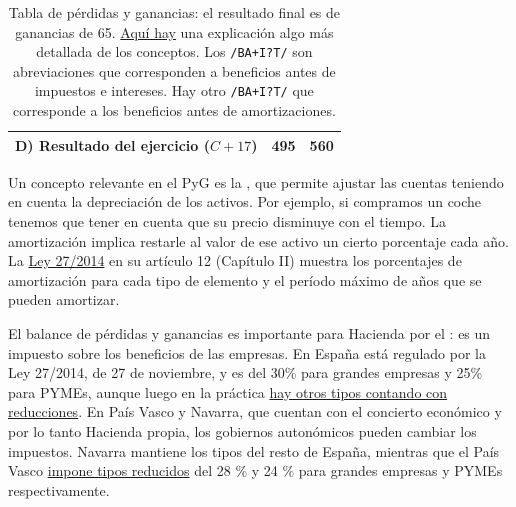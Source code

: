 \documentclass[nochap,palatino,notitlepage]{apuntes}
\begin{document}
\begin{table}[hbtp]
\begin{minipage}{\textwidth}
\begin{tabular}{l|c|c}
\textbf{D) Resultado del ejercicio} ($C + 17$) & \textbf{495} & \textbf{560} \\ \bottomrule
\end{tabular}
\caption{Tabla de pérdidas y ganancias: el resultado final es de ganancias de 65. \href{http://www.plangeneralcontable.com/?tit=guia-del-pgc-de-pymes&name=GeTia&contentId=man_pgcpym&manPage=26}{Aquí hay} una explicación algo más detallada de los conceptos. Los \texttt{/BA+I?T/} son abreviaciones que corresponden a beneficios antes de impuestos e intereses. Hay otro \texttt{/BA+I?T/} que corresponde a los beneficios antes de amortizaciones.}
\label{tab:PyG}
\end{minipage}
\end{table}

Un concepto relevante en el PyG es la , que permite ajustar las cuentas teniendo en cuenta la depreciación de los activos. Por ejemplo, si compramos un coche tenemos que tener en cuenta que su precio disminuye con el tiempo. La amortización implica restarle al valor de ese activo un cierto porcentaje cada año. La \href{http://www.boe.es/diario_boe/txt.php?id=BOE-A-2014-12328}{Ley 27/2014} en su artículo 12 (Capítulo II) muestra los porcentajes de amortización para cada tipo de elemento y el período máximo de años que se pueden amortizar.

El balance de pérdidas y ganancias es importante para Hacienda por el : es un impuesto sobre los beneficios de las empresas. En España está regulado por la Ley 27/2014, de 27 de noviembre, y es del 30\% para grandes empresas y 25\% para PYMEs, aunque luego en la práctica \href{http://www.agenciatributaria.es/AEAT.internet/Inicio/_Segmentos_/Empresas_y_profesionales/Empresas/Impuesto_sobre_Sociedades/Periodos_impositivos_iniciados_hasta_31_12_2014/Tipos_de_gravamen_aplicables_a_periodos_impositivos_iniciados_en_el_ano_2013_y_2014.shtml}{hay otros tipos contando con reducciones}. En País Vasco y Navarra, que cuentan con el concierto económico y por lo tanto Hacienda propia, los gobiernos autonómicos pueden cambiar los impuestos. Navarra mantiene los tipos del resto de España, mientras que el País Vasco \href{http://www.ogasun.ejgv.euskadi.eus/r51-341/es/contenidos/informacion/6901/es_2316/es_12215.html}{impone tipos reducidos} del 28 \% y 24 \% para grandes empresas y PYMEs respectivamente.
\end{document}
